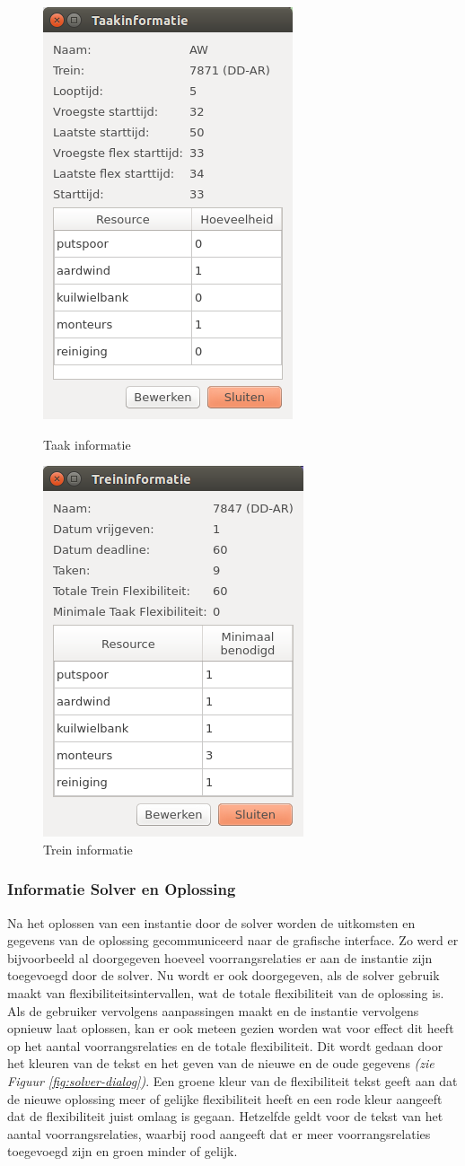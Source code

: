 \begin{figure}[H]
\parbox{.45\linewidth}{
    \center
    \includegraphics[width=.4\textwidth]{../images/taak-info.png}
    \caption{Taak informatie}
    \label{fig:taak-info}
}\hfill
\parbox{.45\linewidth}{
    \center
    \includegraphics[width=.4\textwidth]{../images/trein-info.png}
    \caption{Trein informatie}
    \label{fig:trein-info}
}
\end{figure}

\subsubsection{Informatie Solver en Oplossing}
Na het oplossen van een instantie door de solver worden de uitkomsten en gegevens van de oplossing gecommuniceerd naar de grafische interface. Zo werd er bijvoorbeeld al doorgegeven hoeveel voorrangsrelaties er aan de instantie zijn toegevoegd door de solver. Nu wordt er ook doorgegeven, als de solver gebruik maakt van flexibiliteitsintervallen, wat de totale flexibiliteit van de oplossing is. Als de gebruiker vervolgens aanpassingen maakt en de instantie vervolgens opnieuw laat oplossen, kan er ook meteen gezien worden wat voor effect dit heeft op het aantal voorrangsrelaties en de totale flexibiliteit. Dit wordt gedaan door het kleuren van de tekst en het geven van de nieuwe en de oude gegevens \emph{(zie Figuur \ref{fig:solver-dialog})}. Een groene kleur van de flexibiliteit tekst geeft aan dat de nieuwe oplossing meer of gelijke flexibiliteit heeft en een rode kleur aangeeft dat de flexibiliteit juist omlaag is gegaan. Hetzelfde geldt voor de tekst van het aantal voorrangsrelaties, waarbij rood aangeeft dat er meer voorrangsrelaties toegevoegd zijn en groen minder of gelijk.

